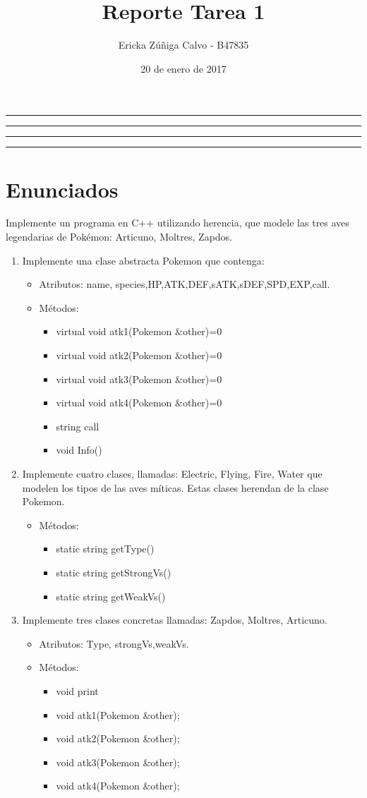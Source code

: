 \documentclass[11pt]{article}
\title{Reporte Tarea 1}
\author{Ericka Z\'u\~niga Calvo - B47835}
\date{20 de enero de 2017}
\begin{document}
\maketitle
\hrule
\hrule
\tableofcontents
\hspace{5mm}
\hrule
\hrule


\section{Enunciados}
Implemente un programa en C++ utilizando herencia, que modele las tres aves legendarias de Pok\'emon: Articuno, Moltres, Zapdos.

\begin{enumerate}
\item Implemente una clase abstracta Pokemon que contenga:
\begin{itemize}
\item Atributos: name, species,HP,ATK,DEF,sATK,sDEF,SPD,EXP,call.
\item M\'etodos:
\begin{itemize}
\item virtual void atk1(Pokemon \&other)=0
\item virtual void atk2(Pokemon \&other)=0
\item virtual void atk3(Pokemon \&other)=0
\item virtual void atk4(Pokemon \&other)=0
\item string call
\item void Info()
\end{itemize}
\end{itemize}
\item Implemente cuatro clases, llamadas: Electric, Flying, Fire, Water que modelen los tipos de las aves m\'iticas. Estas clases herendan de la clase Pokemon.
\begin{itemize}
\item M\'etodos:
\begin{itemize}
\item static string getType()
\item static string getStrongVs()
\item static string getWeakVs()
\end{itemize}
\end{itemize}
\item Implemente tres clases concretas llamadas: Zapdos, Moltres, Articuno.
\begin{itemize}
\item Atributos: Type, strongVs,weakVs.
\item M\'etodos:
\begin{itemize}
\item void print
\item void atk1(Pokemon \&other);
\item void atk2(Pokemon \&other);
\item void atk3(Pokemon \&other);
\item void atk4(Pokemon \&other);


\end{itemize}
\end{itemize}
\end{enumerate}
\end{document}
